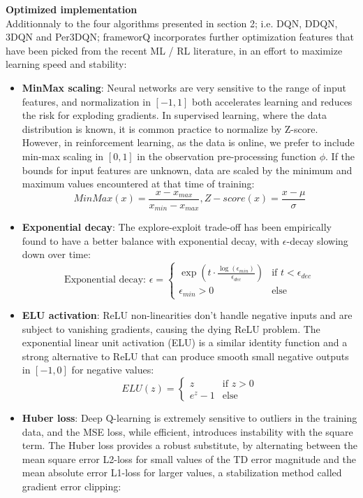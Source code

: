 \textbf{Optimized implementation} \\
Additionnaly to the four algorithms presented in section 2; i.e. DQN, DDQN, 3DQN and Per3DQN; frameworQ incorporates further optimization features that have been picked from the recent ML / RL literature, in an effort to maximize learning speed and stability:
\begin{itemize}
\setlength\itemsep{-0.5em}
  \item \textbf{MinMax scaling}: Neural networks are very sensitive to the range of input features, and  normalization in $[-1,1]$ both accelerates learning and reduces the risk for exploding gradients. In supervised learning, where the data distribution is known, it is common practice to normalize by Z-score. However, in reinforcement learning, as the data is online, we prefer to include min-max scaling in $[0, 1]$ in the observation pre-processing function $\phi$. If the bounds for input features are unknown, data are scaled by the minimum and maximum values encountered at that time of training:
  \[ MinMax(x) = \frac{x - x_{max}}{x_{min} - x_{max}}, Z-score(x) = \frac{x - \mu}{\sigma} \]
  \item \textbf{Exponential decay}: The explore-exploit trade-off has been empirically found to have a better balance with exponential decay, with $\epsilon$-decay slowing down over time:
  \[ 
  \text{Exponential decay: } \epsilon = 
  \begin{cases}
      \exp(t \cdot \frac{\log(\epsilon_{min})}{\epsilon_{dec}}) & \text{if } t < \epsilon_{dec}\\
      \epsilon_{min} > 0 & \text{else}
  \end{cases}
  \]
  \item \textbf{ELU activation}: ReLU non-linearities don't handle negative inputs and are subject to vanishing gradients, causing the dying ReLU problem. The exponential linear unit activation (ELU) is a similar identity function and a strong alternative to ReLU that can produce smooth small negative outputs in $[-1,0]$ for negative values:
  \[
  ELU(z)=
  \begin{cases}
      z & \text{if } z > 0 \\
      e^z - 1 & \text{else}
  \end{cases}
  \]
  \item \textbf{Huber loss}: Deep Q-learning is extremely sensitive to outliers in the training data, and the MSE loss, while efficient, introduces instability with the square term. The Huber loss provides a robust substitute, by alternating between the mean square error L2-loss for small values of the TD error magnitude and the mean absolute error L1-loss for larger values, a stabilization method called gradient error clipping:

\end{itemize}
